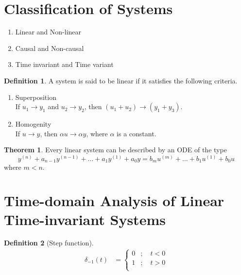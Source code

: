\documentclass[fleqn, a4paper, 12pt, twoside]{article}
\theoremstyle{definition}
\newtheorem{definition}{Definition}
\theoremstyle{theorem}
\newtheorem{theorem}{Theorem}
\begin{document}
\newpage

\section{Classification of Systems}

\begin{enumerate}
	\item Linear and Non-linear
	\item Causal and Non-causal
	\item Time invariant and Time variant
\end{enumerate}

\begin{definition}
	A system is said to be linear if it satisfies the following criteria.
	\begin{enumerate}
		\item Superposition\\
			If $u_1 \to y_1$ and $u_2 \to y_2$, then $\left( u_1 + u_2 \right) \to \left( y_1 + y_3 \right)$.
		\item Homogenity\\
			If $u \to y$, then $\alpha u \to \alpha y$, where $\alpha$ is a constant.
	\end{enumerate}
\end{definition}

\begin{theorem}
	Every linear system can be described by an ODE of the type
	\begin{equation*}
		y^{(n)} + a_{n - 1} y^{(n - 1)} + \dots + a_1 y^{(1)} + a_0 y = b_m u^{(m)} + \dots + b_1 u^{(1)} + b_0 u
	\end{equation*}
	where $m < n$.
	\label{representation_of_linear_system_by_ODE}
\end{theorem}

\section{Time-domain Analysis of Linear Time-invariant Systems}

\begin{definition}[Step function]
	\begin{align*}
		\delta_{-1}(t) &=
			\begin{cases}
				0 & ;\quad t < 0 \\
				1 & ;\quad t > 0 \\
			\end{cases}
	\end{align*}
\end{definition}
\end{document}
